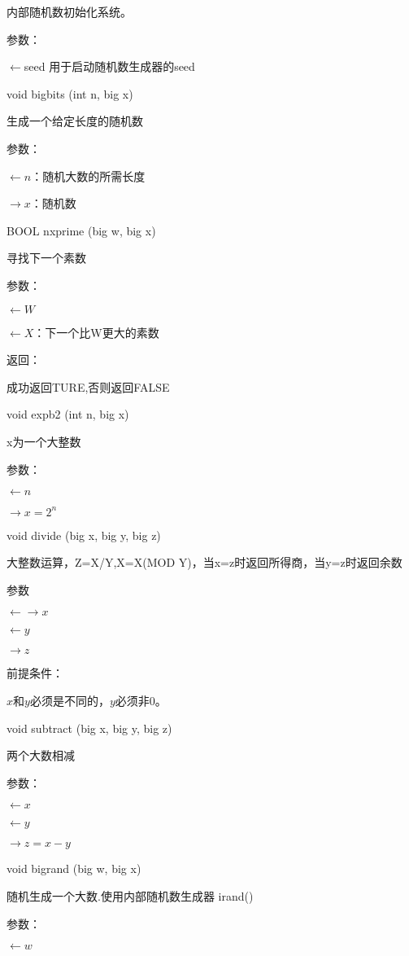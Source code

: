 内部随机数初始化系统。

参数：



$\leftarrow$seed 用于启动随机数生成器的seed

void bigbits (int n, big x)

生成一个给定长度的随机数

参数：

$\leftarrow n$：随机大数的所需长度

$\rightarrow x$：随机数



BOOL nxprime (big w, big x)

寻找下一个素数

参数：

$\leftarrow W$

$\leftarrow X$：下一个比W更大的素数

返回：

成功返回TURE,否则返回FALSE



void expb2 (int n, big x)

x为一个大整数

参数：

$\leftarrow n$

$\rightarrow x=2^n$



void divide (big x, big y, big z)

大整数运算，Z=X/Y,X=X(MOD Y)，当x=z时返回所得商，当y=z时返回余数\cite{Cyuyan}

参数

$\leftarrow \rightarrow x$

$\leftarrow y$

$\rightarrow z$

前提条件：

$x$和$y$必须是不同的，$y$必须非0。



void subtract (big x, big y, big z)

两个大数相减

参数：

$\leftarrow x$

$\leftarrow y$

$\rightarrow z =x-y$



void bigrand (big w, big x)

随机生成一个大数.使用内部随机数生成器 irand()

参数：

$\leftarrow w$

